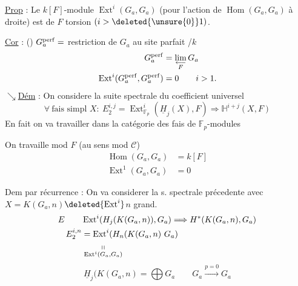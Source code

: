 
\uline{Prop} : Le $k[F]$-module $\operatorname{Ext}^i(G_a,G_a)$ (pour l'action de $\operatorname{Hom}(G_a,G_a)$ à droite) est de $F$ torsion $(i>\deleted{\unsure{0}}1)$.

\uline{Cor} : () $G_a^{\rm perf}=$ restriction de $G_a$ au site parfait /$k$
\[
\begin{aligned}
G_a^{\rm perf}&=\lim_{\substack{\longleftarrow\\ F}}G_a\\
\operatorname{Ext}^i(G_a^{\rm perf},G_a^{\rm perf})&=0\qquad i>1.
\end{aligned}
\]
$\searrow$\quad\uline{Dém} : On considere la suite spectrale du coefficient universel
\[
\forall\ \text{fais simpl }X:\ E_2^{i,j}=\operatorname{Ext}^i_{\mathbb F_p}(\underline H_j(X),F)\Longrightarrow \mathbb H^{i+j}(X,F)
\]
En fait on va travailler dans la catégorie des fais de $\mathbb F_p$-modules

On travaille mod $F$ (au sens mod $\mathcal C$)
\[
\begin{aligned}
\operatorname{Hom}(G_a,G_a)&=k[F]\\
\operatorname{Ext}^1(G_a,G_a)&=0
\end{aligned}
\]

Dem par récurrence : On va considerer la s. spectrale précedente avec $X=K(G_a,n)$\qquad $\deleted{\operatorname{Ext}^i}$\quad $n$ grand.
\[
\begin{aligned}
E\qquad&\operatorname{Ext}^i(H_j(K(G_a,n)),G_a)\Longrightarrow H^*(K(G_a,n),G_a)\\
E_2^{i,n}&=\operatorname{Ext}^i(H_n(K(G_a,n)\ G_a)\\
&\underset{\operatorname{Ext}^i(G_a,G_a)}{\shortparallel}
\end{aligned}
\]
\[
\underline H_j(K(G_a,n)=\bigoplus G_a\qquad G_a\xrightarrow{p=0}G_a
\]
